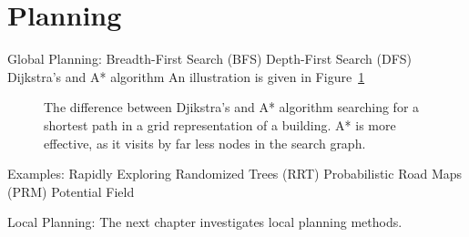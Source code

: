 \section{Planning}\label{sec:global}
Global Planning:
Breadth-First Search (BFS)
Depth-First Search (DFS)
Dijkstra's and A* algorithm
An illustration is given in Figure~\ref{fig:fig_overview}
\begin{figure}[thpb]
	  \myfloatalign
      \footnotesize
      \centering
    
   \caption[Djikstra's and A* algorithm.]{The difference between Djikstra's and A* algorithm searching for a shortest path in a grid representation of a building. A* is more effective, as it visits by far less nodes in the search graph. }
\label{fig:fig_overview}
\end{figure}
Examples: 
Rapidly Exploring Randomized Trees (RRT)
Probabilistic Road Maps (PRM)
Potential Field

Local Planning:
The next chapter investigates local planning methods.





